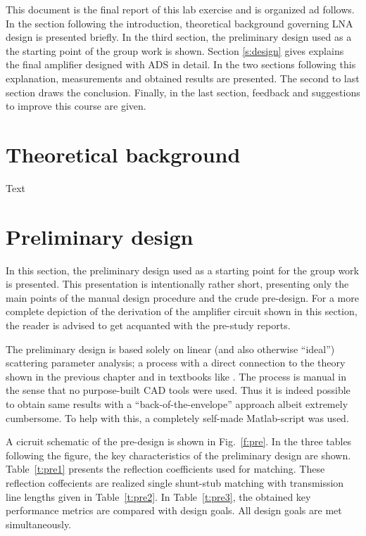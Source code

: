 \documentclass[a4paper, 12pt]{article}
\begin{document}
This document is the final report of this lab exercise and is organized ad follows. 
In the section following the introduction, theoretical background governing LNA design is 
presented briefly. In the third section, the preliminary design used as a the starting 
point of the group work is shown. Section \ref{s:design} gives explains the final amplifier 
designed with ADS in detail. In the two sections following this explanation, measurements 
and obtained results are presented. The second to last section draws the conclusion. 
Finally, in the last section, feedback and suggestions to improve this course are given.

\newpage
\section{Theoretical background}

Text

\newpage
\section{Preliminary design}

In this section, the preliminary design used as a starting point for the group work is presented. 
This presentation is intentionally rather short, presenting only the main points of the manual 
design procedure and the crude pre-design. For a more complete depiction of the derivation of 
the amplifier circuit shown in this section, the reader is advised to get acquanted with the 
pre-study reports.

The preliminary design is based solely on linear (and also otherwise ``ideal'') scattering 
parameter analysis; a process with a direct connection to the theory shown in the previous 
chapter and in textbooks like \cite{bahl, gonz, pozar}. The process is manual in the sense 
that no purpose-built CAD tools were used. Thus it is indeed possible to obtain same results 
with a ``back-of-the-envelope'' approach albeit extremely cumbersome. To help with this, 
a completely self-made Matlab-script was used.

A cicruit schematic of the pre-design is shown in Fig.~\ref{f:pre}. In the three tables following 
the figure, the key characteristics of the preliminary design are shown. Table~\ref{t:pre1} presents 
the reflection coefficients used for matching. These reflection coffecients are realized single 
shunt-stub matching with transmission line lengths given in Table~\ref{t:pre2}. In Table~\ref{t:pre3}, 
the obtained key performance metrics are compared with design goals. All design goals are met simultaneously.
\end{document}
